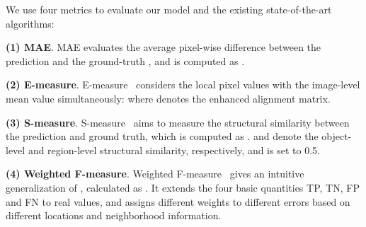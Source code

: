 \documentclass[lettersize,journal]{IEEEtran}
\begin{document}
We use four metrics to evaluate our model and the existing state-of-the-art algorithms:

\textbf{(1) MAE}. MAE evaluates the average pixel-wise difference between the prediction  and the ground-truth , and is computed as .



\textbf{(2) E-measure}. E-measure~\cite{ijcai2018p97} considers the local pixel values with the image-level mean value simultaneously:  where  denotes the enhanced alignment matrix. 

\textbf{(3) S-measure}. S-measure~\cite{fan2017structure} aims to measure the structural similarity between the prediction and ground truth, which is computed as .  and  denote the object-level and region-level structural similarity, respectively, and  is set to 0.5. 

\textbf{(4) Weighted F-measure}. Weighted F-measure~\cite{6909433} gives an intuitive generalization of , calculated as . It extends the four basic quantities TP, TN, FP and FN to real values, and assigns different weights  to different errors based on different locations and neighborhood information.
\end{document}
